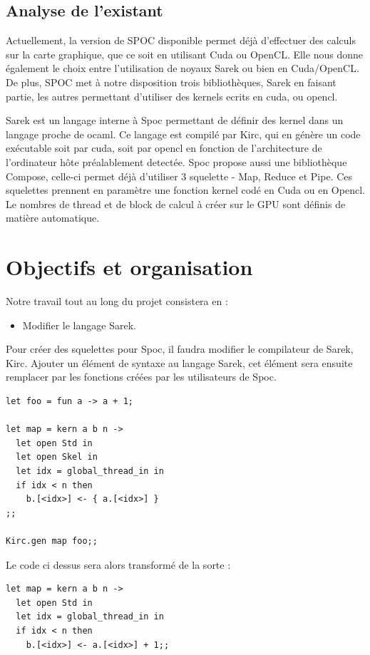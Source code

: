 \documentclass{report}
\begin{document}
\section{Analyse de l'existant}
Actuellement, la version de SPOC disponible permet déjà d’effectuer des calculs sur la carte graphique, que ce soit en utilisant Cuda ou OpenCL. Elle nous donne également le choix entre l’utilisation de noyaux Sarek ou bien en Cuda/OpenCL. De plus, SPOC met à notre disposition trois bibliothèques, Sarek en faisant partie, les autres permettant d’utiliser des kernels ecrits en cuda, ou opencl.\newline

Sarek est un langage interne à Spoc permettant de définir des kernel dans un langage proche de ocaml. Ce langage est compilé par Kirc, qui en génère un code exécutable soit par cuda, soit par opencl en fonction de l’architecture de l’ordinateur hôte préalablement detectée.
Spoc propose aussi une bibliothèque Compose, celle-ci permet déjà d’utiliser 3 squelette - Map, Reduce et Pipe. Ces squelettes prennent en paramètre une fonction kernel codé en Cuda ou en Opencl. Le nombres de thread et de block de calcul à créer sur le GPU sont définis de matière automatique. 
  
\chapter{Objectifs et organisation}

Notre travail tout au long du projet consistera en :
\begin{itemize}
\item Modifier le langage Sarek.
\end{itemize}

Pour créer des squelettes pour Spoc, il faudra modifier le compilateur de Sarek, Kirc. Ajouter un élément de syntaxe au langage Sarek, cet élément sera ensuite remplacer par les fonctions créées par les utilisateurs de Spoc. 

\begin{lstlisting}
let foo = fun a -> a + 1;

let map = kern a b n ->
  let open Std in
  let open Skel in
  let idx = global_thread_in in
  if idx < n then
    b.[<idx>] <- { a.[<idx>] }
;;

Kirc.gen map foo;; 
\end{lstlisting}

Le code ci dessus sera alors transformé de la sorte :

\begin{lstlisting}
let map = kern a b n ->
  let open Std in
  let idx = global_thread_in in
  if idx < n then
    b.[<idx>] <- a.[<idx>] + 1;;
\end{lstlisting}
\end{document}
